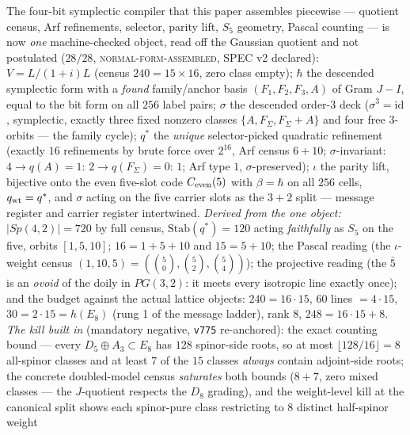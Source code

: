 \begin{keybox}[The finite compiler normal form $C_{\rm fin}=(V,\hbar,q^{*},\sigma,\iota)$ (2026-08-07) --- one object, the kill built in \mE\ (\veri{v845\_cfin\_normal\_form.py})]
The four-bit symplectic compiler that this paper assembles
piecewise --- quotient census, Arf refinements, selector, parity
lift, $S_5$ geometry, Pascal counting --- is now \emph{one}
machine-checked object, read off the Gaussian quotient and not
postulated ($28/28$, \textsc{normal-form-assembled}, SPEC v2
declared): $V = L/(1{+}i)L$ (census $240 = 15\times16$, zero
class empty); $\hbar$ the descended symplectic form with a
\emph{found} family/anchor basis $(F_1, F_2, F_3, A)$ of Gram
$J - I$, equal to the bit form on all $256$ label pairs;
$\sigma$ the descended order-$3$ deck ($\sigma^3 = \mathrm{id}$,
symplectic, exactly three fixed nonzero classes
$\{A, F_\Sigma, F_\Sigma{+}A\}$ and four free $3$-orbits --- the
family cycle); $q^{*}$ the \emph{unique} selector-picked
quadratic refinement (exactly $16$ refinements by brute force
over $2^{16}$, Arf census $6 + 10$; $\sigma$-invariant: $4 \to
q(A){=}1$: $2 \to q(F_\Sigma){=}0$: $1$; Arf type $1$,
$\sigma$-preserved); $\iota$ the parity lift, bijective onto the
even five-slot code $C_{\rm even}(5)$ with $\beta = \hbar$ on all
$256$ cells, $q_{\rm wt} = q^{*}$, and $\sigma$ acting on the
five carrier slots as the $3{+}2$ split --- message register and
carrier register intertwined.  \emph{Derived from the one
object:} $\lvert Sp(4,2)\rvert = 720$ by full census,
$\mathrm{Stab}(q^{*}) = 120$ acting \emph{faithfully} as $S_5$ on
the five, orbits $[1, 5, 10]$; $16 = 1 + 5 + 10$ and
$15 = 5 + 10$; the Pascal reading (the $\iota$-weight census
$(1, 10, 5) = (\binom50, \binom52, \binom54)$); the projective
reading (the $\bar5$ is an \emph{ovoid} of the doily in
$PG(3,2)$: it meets every isotropic line exactly once); and the
budget against the actual lattice objects: $240 = 16\cdot15$,
$60$ lines $= 4\cdot15$, $30 = 2\cdot15 = h(E_8)$ (rung 1 of the
message ladder), rank $8$, $248 = 16\cdot15 + 8$.  \emph{The kill
built in} (mandatory negative, \texttt{v775} re-anchored): the
exact counting bound --- every $D_5{\oplus}A_3 \subset E_8$ has
$128$ spinor-side roots, so at most $\lfloor128/16\rfloor = 8$
all-spinor classes and at least $7$ of the $15$ classes
\emph{always} contain adjoint-side roots; the concrete
doubled-model census \emph{saturates} both bounds ($8 + 7$, zero
mixed classes --- the $J$-quotient respects the $D_8$ grading),
and the weight-level kill at the canonical split shows each
spinor-pure class restricting to $8$ distinct half-spinor weight

\end{keybox}
